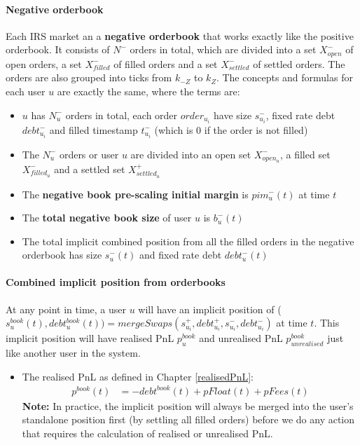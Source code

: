 \documentclass{article}%
\begin{document}
\paragraph{Negative orderbook} Each IRS market an a \textbf{negative orderbook} that works exactly like the positive orderbook. It consists of $N^{-}$  orders in total, which are divided into a set $X_{open}^{-}$ of open orders, a set $X_{filled}^{-}$ of filled orders and a set $X_{settled}^{-}$ of settled orders. The orders are also grouped into ticks from $k_{-Z}$ to $k_Z$. The concepts and formulas for each user $u$ are exactly the same, where the terms are: 
\begin{itemize}
    \item $u$ has $N_u^{-}$ orders in total, each order $order_{u_i}$ have size $s_{u_i}^{-}$, fixed rate debt $debt_{u_i}^{-}$ and filled timestamp $t_{u_i}^{-}$ (which is 0 if the order is not filled)
    \item The $N_u^{-}$ orders or user $u$ are divided into an open set $X_{open_{u}}^{-}$, a filled set $X_{filled_{u}}^{-}$ and a settled set $X_{settled_{u}}^{+}$
    \item The \textbf{negative book pre-scaling initial margin} is $pim^{-}_{u}(t)$ at time $t$
    \item The \textbf{total negative book size} of user $u$ is $b^{-}_{u}(t)$
    \item The total implicit combined position from all the filled orders in the negative orderbook has size $s_{u}^-(t)$ and fixed rate debt $debt_{u}^-(t)$
\end{itemize}

\paragraph{Combined implicit position from orderbooks} At any point in time, a user $u$ will have an implicit position of ($s_{u}^{book}(t), debt_u^{book}(t)) = mergeSwaps(s_{u_i}^{+}, debt_{u_i}^{+}, s_{u_i}^{-}, debt_{u_i}^{-}) $ at time $t$. This implicit position will have realised PnL $p_u^{book}$ and unrealised PnL $p_{unrealised}^{book}$ just like another user in the system.
\begin{itemize}
    \item The realised PnL as defined in Chapter \ref{realisedPnL}:
        \begin{align*}
            p^{book}(t) &= -debt^{book}(t) + pFloat(t) + pFees(t)
        \end{align*}
\textbf{Note:} In practice, the implicit position will always be merged into the user's standalone position first (by settling all filled orders) before we do any action that requires the calculation of realised or unrealised PnL.
\end{itemize}
\end{document}
